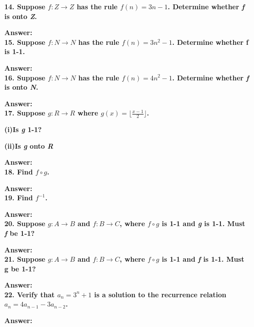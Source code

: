 \documentclass{article}
\begin{document}
\begin{large}
\textbf{14. Suppose $f:Z\to Z$ has the rule $f(n)=3n-1$. Determine whether \emph{f} is onto \emph{Z}.}

\textbf{Answer:} \\




\textbf{15. Suppose $f:N\to N$ has the rule $f(n)=3{n^{2}}-1$. Determine whether f is 1-1.}

\textbf{Answer:} \\




\textbf{16. Suppose $f:N\to N$ has the rule $f(n)=4{n^{2}-1}$. Determine whether \emph{f} is onto \emph{N}.}

\textbf{Answer:} \\





\textbf{17. Suppose $g:R\to R$ where $g(x)=\lfloor \frac{x-1}{2}\rfloor$.}

\textbf{(i)Is \emph{g} 1-1?}

\textbf{(ii)Is \emph{g} onto \emph{R}}

\textbf{Answer:} \\




\textbf{18. Find $f\circ g$.} 


\textbf{Answer:} \\




\textbf{19. Find $f^{-1}$.}

\textbf{Answer:} \\




\textbf{20. Suppose $g:A\to B$ and $f:B\to C$, where $f\circ g$ is 1-1 and \emph{g} is 1-1. Must \emph{f} be 1-1?}

\textbf{Answer:} \\





\textbf{21. Suppose $g:A\to B$ and $f:B\to C$, where $f\circ g$ is 1-1 and \emph{f} is 1-1. Must g be 1-1?}

\textbf{Answer:} \\




\textbf{22. Verify that $a_{n}={3^{n}+1}$ is a solution to the recurrence relation $a_{n}=4a_{n-1}-3a_{n-2}$.}

\textbf{Answer:} \\






\end{large}
\end{document}

